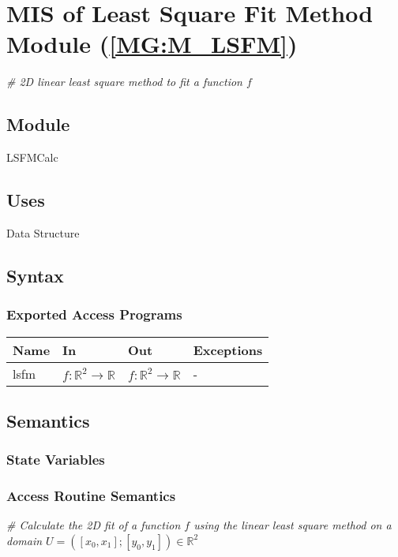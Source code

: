 \documentclass[12pt, titlepage]{article}
\begin{document}
\section{MIS of Least Square Fit Method Module (\texorpdfstring{\cref{MG:M_LSFM}}))} \label{MIS_LSFM}

\textit{{\#} 2D linear least square method to fit a function $f$} \medskip

\subsection{Module}
LSFMCalc
\subsection{Uses}
Data Structure
\subsection{Syntax}

\subsubsection{Exported Access Programs}

\begin{center}
\begin{tabular}{p{2cm} p{4cm} p{4cm} p{2cm}}
\hline
\textbf{Name} & \textbf{In} & \textbf{Out} & \textbf{Exceptions} \\
\hline
lsfm & $f:\mathbb{R}^2\rightarrow\mathbb{R}$ & $f:\mathbb{R}^2\rightarrow\mathbb{R}$ & - \\
\hline
\end{tabular}
\end{center}

\subsection{Semantics}

\subsubsection{State Variables}


\subsubsection{Access Routine Semantics}

\noindent\textit{{\#} Calculate the 2D fit of a function $f$ using the linear least square method on a domain $U=([x_0,x_1];[y_0,y_1]) \in \mathbb{R}^2$} \medskip
\end{document}
